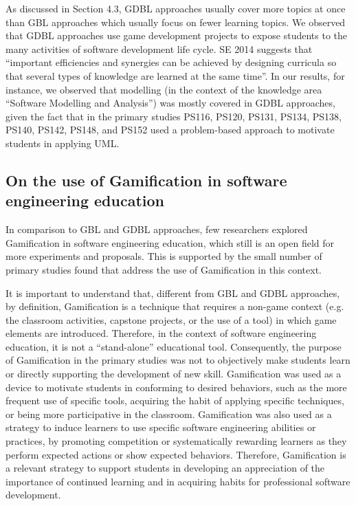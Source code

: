 As discussed in Section 4.3, GDBL approaches usually cover more topics at once than GBL approaches which usually focus on fewer learning topics. We observed that GDBL approaches use game development projects to expose students to the many activities of software development life cycle. SE 2014 suggests that “important efficiencies and synergies can be achieved by designing curricula so that several types of knowledge are learned at the same time”. In our results, for instance, we observed that modelling (in the context of the knowledge area “Software Modelling and Analysis”) was mostly covered in GDBL approaches, given the fact that in the primary studies PS116, PS120, PS131, PS134, PS138, PS140, PS142, PS148, and PS152 used a problem-based approach to motivate students in applying UML.

\subsection{On the use of Gamification in software engineering education}
\label{sec:smsdiscussiongamification}

In comparison to GBL and GDBL approaches, few researchers explored Gamification in software engineering education, which still is an open field for more experiments and proposals. This is supported by the small number of primary studies found that address the use of Gamification in this context.

It is important to understand that, different from GBL and GDBL approaches, by definition, Gamification is a technique that requires a non-game context (e.g. the classroom activities, capstone projects, or the use of a tool) in which game elements are introduced. Therefore, in the context of software engineering education, it is not a “stand-alone” educational tool. Consequently, the purpose of Gamification in the primary studies was not to objectively make students learn or directly supporting the development of new skill. Gamification was used as a device to motivate students in conforming to desired behaviors, such as the more frequent use of specific tools, acquiring the habit of applying specific techniques, or being more participative in the classroom. Gamification was also used as a strategy to induce learners to use specific software engineering abilities or practices, by promoting competition or systematically rewarding learners as they perform expected actions or show expected behaviors. Therefore, Gamification is a relevant strategy to support students in developing an appreciation of the importance of continued learning and in acquiring habits for professional software development.

